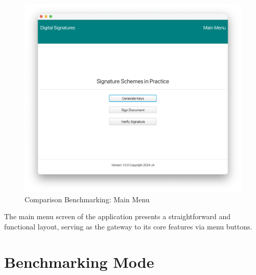 \documentclass[]{final_report}
\begin{document}
\begin{figure}[H]
    \centering
    \includegraphics[scale=0.4]{main_pictures/ui/mainMenu.png}
   \caption{Comparison Benchmarking: Main Menu}
\end{figure}
The main menu screen of the application presents a straightforward and functional layout, serving as the gateway to its core features via menu buttons. 


\chapter{Benchmarking Mode}
\end{document}
